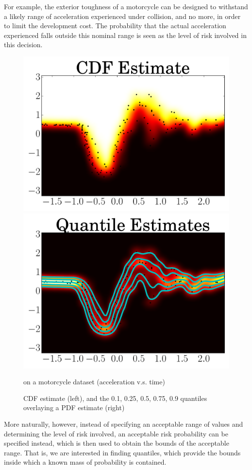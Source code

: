 \documentclass[twoside]{article} \usepackage{aistats2017}
\theoremstyle{definition}
\theoremstyle{theorem}
\begin{document}
	For example, the exterior toughness of a motorcycle can be designed to withstand a likely range of acceleration experienced under collision, and no more, in order to limit the development cost. The probability that the actual acceleration experienced falls outside this nominal range is seen as the level of risk involved in this decision. 

	\begin{figure}
		\begin{center}
			\includegraphics[width=0.48\columnwidth]{figures/mcquantiles_1}
			\includegraphics[width=0.48\columnwidth]{figures/mcquantiles_2}
		\end{center}
		\caption{\small CDF estimate (left), and the 0.1, 0.25, 0.5, 0.75, 0.9 quantiles overlaying a PDF estimate (right)} on a motorcycle dataset (acceleration v.s. time)
		\label{fig:quantile_regression_motorcycle}
	\end{figure}
	
	More naturally, however, instead of specifying an acceptable range of values and determining the level of risk involved, an acceptable risk probability can be specified instead, which is then used to obtain the bounds of the acceptable range. That is, we are interested in finding quantiles, which provide the bounds inside which a known mass of probability is contained. 
	
	
\end{document}
